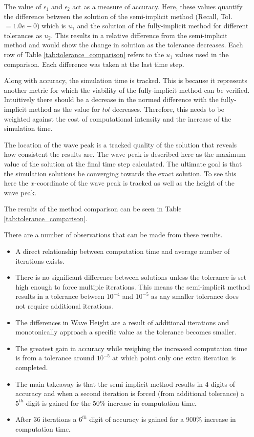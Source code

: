 The value of $\epsilon_1$ and $\epsilon_2$ act as a measure of accuracy.
Here, these values quantify the difference between the solution of the semi-implicit method (Recall, Tol. $= 1.0e-0$) which is $u_1$ and the solution of the fully-implicit method for different tolerances as $u_2$. 
This results in a relative difference from the semi-implicit method and would show the change in solution as the tolerance decreases.
Each row of Table \ref{tab:tolerance_comparison} refers to the $u_1$ values used in the comparison.
Each difference was taken at the last time step.

Along with accuracy, the simulation time is tracked.
This is because it represents another metric for which the viability of the fully-implicit method can be verified.
Intuitively there should be a decrease in the normed difference with the fully-implicit method as the value for $tol$ decreases.
Therefore, this needs to be weighted against the cost of computational intensity and the increase of the simulation time.

The location of the wave peak is a tracked quality of the solution that reveals how consistent the results are.
The wave peak is described here as the maximum value of the solution at the final time step calculated.
The ultimate goal is that the simulation solutions be converging towards the exact solution.
To see this here the $x$-coordinate of the wave peak is tracked as well as the height of the wave peak.

The results of the method comparison can be seen in Table \ref{tab:tolerance_comparison}.



There are a number of observations that can be made from these results.
\begin{itemize}
  \item A direct relationship between computation time and average number of iterations exists.
  \item There is no significant difference between solutions unless the tolerance is set high enough to force multiple iterations. 
        This means the semi-implicit method results in a tolerance between $10^{-4}$ and $10^{-5}$ as any smaller tolerance does not require additional iterations.
  \item The differences in Wave Height are a result of additional iterations and monotonically approach a specific value as the tolerance becomes smaller.
  \item The greatest gain in accuracy while weighing the increased computation time is from a tolerance around $10^{-5}$ at which point only one extra iteration is completed.
  \item The main takeaway is that the semi-implicit method results in 4 digits of accuracy and when a second iteration is forced (from additional tolerance) a $5^{th}$ digit is gained for the $50\%$ increase in computation time.
  \item After $36$ iterations a $6^{th}$ digit of accuracy is gained for a $900\%$ increase in computation time.
\end{itemize}

